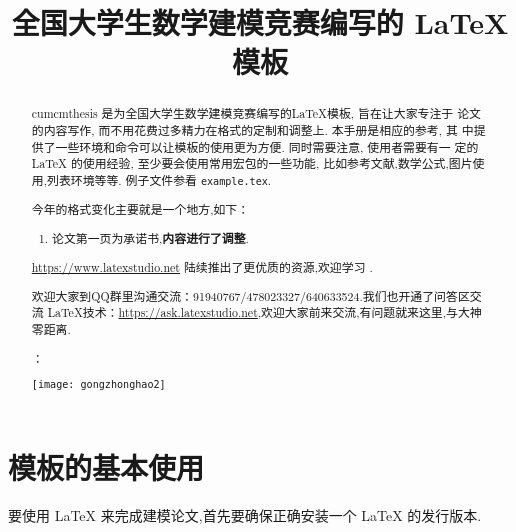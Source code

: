 \documentclass{cumcmthesis}
\title{全国大学生数学建模竞赛编写的 \LaTeX{} 模板}
\begin{document}
 \maketitle
 \begin{abstract}
cumcmthesis 是为全国大学生数学建模竞赛编写的\LaTeX{}模板, 旨在让大家专注于 论文的内容写作, 而不用花费过多精力在格式的定制和调整上. 本手册是相应的参考, 其 中提供了一些环境和命令可以让模板的使用更为方便. 同时需要注意, 使用者需要有一 定的 \LaTeX{} 的使用经验, 至少要会使用常用宏包的一些功能, 比如参考文献,数学公式,图片使用,列表环境等等. 例子文件参看 \texttt{example.tex}.

\begin{mdframed} [%
	roundcorner=5pt,
	linecolor=gray!50,
	outerlinewidth=0.5pt,
	middlelinewidth=0.3pt, backgroundcolor=gray!2,
innertopmargin=\topskip, frametitle={2023 年建模比赛格式变化说明},
frametitlefont= \bfseries,frametitlerule=true,frametitlealignment =\raggedright\noindent,
frametitlerulewidth=.5pt, frametitlebackgroundcolor=gray!2,]
今年的格式变化主要就是一个地方,如下：
\begin{enumerate}
\item 论文第一页为承诺书,\textbf{\color{red}内容进行了调整}.

 

\end{enumerate}

\end{mdframed}


\url{https://www.latexstudio.net} 陆续推出了更优质的资源,欢迎学习 .

欢迎大家到QQ群里沟通交流：91940767/478023327/640633524.我们也开通了问答区交流 \LaTeX{}技术：\url{https://ask.latexstudio.net},欢迎大家前来交流,有问题就来这里,与大神零距离.

：

\centerline{\texttt{[image: gongzhonghao2]}}

\end{abstract}



\section{模板的基本使用}

要使用 \LaTeX{} 来完成建模论文,首先要确保正确安装一个 \LaTeX{} 的发行版本.
\end{document}
